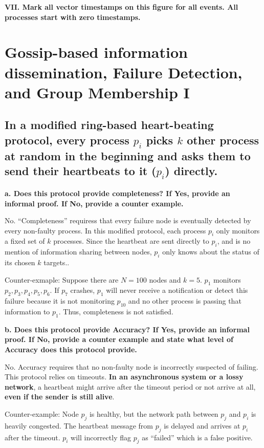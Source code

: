 \documentclass[12pt,a4paper]{article}
\begin{document}
\textbf{VII. Mark all vector timestamps on this figure for all events. All processes start with zero timestamps.}

\section*{Gossip-based information dissemination, Failure Detection, and Group Membership I}

\subsection*{In a modified ring-based heart-beating protocol, every process $p_i$ picks $k$ other process at random in the beginning and asks them to send their heartbeats to it ($p_i$) directly.}

\textbf{a. Does this protocol provide completeness? If Yes, provide an informal proof. If No, provide a counter example.}

No. ``Completeness'' requiress that every failure node is eventually detected by every non-faulty process. In this modified protocol, 
each process $p_i$ only monitors a fixed set of $k$ processes. Since the heartbeat are sent directly to $p_i$, and is no mention of information sharing between nodes, $p_i$ only knows about the status of its chosen $k$  targets..

Counter-exmaple: Suppose there are $N=100$ nodes and $k=5$. $p_1$ monitors $p_2, p_3, p_4, p_5, p_6$. If $p_7$ crashes, 
$p_1$ will never receive a notification or detect this failure because it is not monitoring $p_{10}$ and no other process is passing that information to $p_1$. Thus, completeness is not satisfied.

\textbf{b. Does this protocol provide Accuracy? If Yes, provide an informal proof. If No, provide a counter example and state what level of Accuracy does this protocol provide.}

No. Accuracy requires that no non-faulty node is incorrectly suspected of failing. 
This protocol relies on timeouts. \textbf{In an asynchronous system or a lossy network}, a heartbeat might arrive after the timeout period or not arrive at all, \textbf{even if the sender is still alive}.

Counter-example: Node $p_j$ is healthy, but the network path between $p_j$ and $p_i$ is heavily congested. The heartbeat message from $p_j$ is delayed and arrives at $p_i$ after the timeout. 
$p_i$ will incorrectly flag $p_j$ as ``failed'' which is a false positive.
\end{document}
